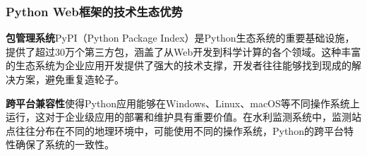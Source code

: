\begin{Shaded}
\begin{Highlighting}[]
\OperatorTok{=}
        \NormalTok{: [}\NormalTok{],}
        \NormalTok{: [}\NormalTok{],}
        \NormalTok{: [}\NormalTok{],}
        \NormalTok{: [}\NormalTok{],}
        \NormalTok{: [}\NormalTok{]}
\NormalTok{    \})}
    
\OperatorTok{=}
    \NormalTok{(}\SpecialCharTok{\{}\NormalTok{prediction[}\NormalTok{]}\NormalTok{)}
    

\end{Highlighting}
\end{Shaded}

\subsubsection{Python Web框架的技术生态优势}\label{python-webux6846ux67b6ux7684ux6280ux672fux751fux6001ux4f18ux52bf}

\textbf{包管理系统}PyPI（Python Package Index）是Python生态系统的重要基础设施，提供了超过30万个第三方包，涵盖了从Web开发到科学计算的各个领域。这种丰富的生态系统为企业应用开发提供了强大的技术支撑，开发者往往能够找到现成的解决方案，避免重复造轮子。

\textbf{跨平台兼容性}使得Python应用能够在Windows、Linux、macOS等不同操作系统上运行，这对于企业级应用的部署和维护具有重要价值。在水利监测系统中，监测站点往往分布在不同的地理环境中，可能使用不同的操作系统，Python的跨平台特性确保了系统的一致性。

